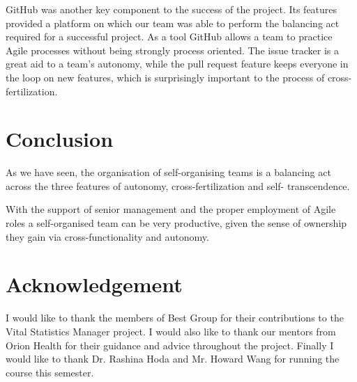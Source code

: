 \documentclass[conference]{IEEEtran}
\begin{document}
GitHub was another key component to the success of the project. Its features
provided a platform on which our team was able to perform the balancing act
required for a successful project. As a tool GitHub allows a team to practice
Agile processes without being strongly process oriented. The issue tracker is a
great aid to a team's autonomy, while the pull request feature keeps everyone in
the loop on new features, which is surprisingly important to the process of
cross-fertilization.

\section{Conclusion}

As we have seen, the organisation of self-organising teams is a balancing act
across the three features of autonomy, cross-fertilization and self-
transcendence.

With the support of senior management and the proper employment of Agile roles
a self-organised team can be very productive, given the sense of ownership they
gain via cross-functionality and autonomy.


\section*{Acknowledgement}

I would like to thank the members of Best Group for their contributions to the
Vital Statistics Manager project. I would also like to thank our mentors from
Orion Health for their guidance and advice throughout the project. Finally I
would like to thank Dr. Rashina Hoda and Mr. Howard Wang for running the course
this semester.




\end{document}

